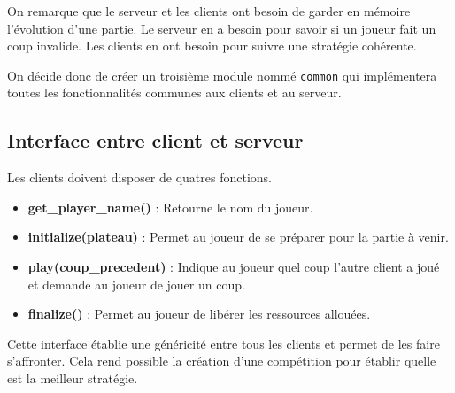 On remarque que le serveur et les clients ont besoin de garder en mémoire l'évolution d'une partie.
Le serveur en a besoin pour savoir si un joueur fait un coup invalide.
Les clients en ont besoin pour suivre une stratégie cohérente.

On décide donc de créer un troisième module nommé \verb|common| qui implémentera toutes les fonctionnalités communes 
aux clients et au serveur.

\subsection{Interface entre client et serveur}

Les clients doivent disposer de quatres fonctions.
\begin{itemize}
    \item \textbf{get\_player\_name()} : Retourne le nom du joueur.
    \item \textbf{initialize(plateau)} : Permet au joueur de se préparer pour la partie à venir.
    \item \textbf{play(coup\_precedent)} : Indique au joueur quel coup l'autre client a joué et demande au joueur de jouer un coup.
    \item \textbf{finalize()} : Permet au joueur de libérer les ressources allouées.
\end{itemize}

Cette interface établie une généricité entre tous les clients et permet de les faire s'affronter.
Cela rend possible la création d'une compétition pour établir quelle est 
la meilleur stratégie.